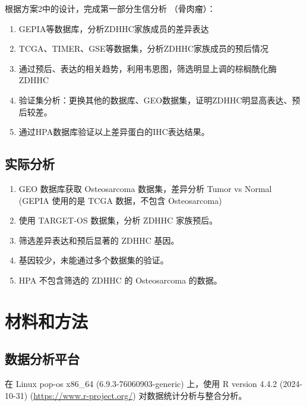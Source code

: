 \documentclass[
]{article}
\providecommand{\tightlist}{%
  \setlength{\itemsep}{0pt}\setlength{\parskip}{0pt}}
\begin{document}
根据方案2中的设计，完成第一部分生信分析 （骨肉瘤）：

\begin{enumerate}
\def\labelenumi{\arabic{enumi}.}
\tightlist
\item
  GEPIA等数据库，分析ZDHHC家族成员的差异表达
\item
  TCGA、TIMER、GSE等数据集，分析ZDHHC家族成员的预后情况
\item
  通过预后、表达的相关趋势，利用韦恩图，筛选明显上调的棕榈酰化酶ZDHHC
\item
  验证集分析：更换其他的数据库、GEO数据集，证明ZDHHC明显高表达、预后较差。
\item
  通过HPA数据库验证以上差异蛋白的IHC表达结果。
\end{enumerate}

\hypertarget{ux5b9eux9645ux5206ux6790}{%
\subsection{实际分析}\label{ux5b9eux9645ux5206ux6790}}

\begin{enumerate}
\def\labelenumi{\arabic{enumi}.}
\tightlist
\item
  GEO 数据库获取 Osteosarcoma 数据集，差异分析 Tumor vs Normal (GEPIA 使用的是 TCGA 数据，不包含 Osteosarcoma)
\item
  使用 TARGET-OS 数据集，分析 ZDHHC 家族预后。
\item
  筛选差异表达和预后显著的 ZDHHC 基因。
\item
  基因较少，未能通过多个数据集的验证。
\item
  HPA 不包含筛选的 ZDHHC 的 Osteosarcoma 的数据。
\end{enumerate}

\hypertarget{introduction}{%
\section{材料和方法}\label{introduction}}

\hypertarget{ux6570ux636eux5206ux6790ux5e73ux53f0}{%
\subsection{数据分析平台}\label{ux6570ux636eux5206ux6790ux5e73ux53f0}}

在 Linux pop-os x86\_64 (6.9.3-76060903-generic) 上，使用 R version 4.4.2 (2024-10-31) (\url{https://www.r-project.org/}) 对数据统计分析与整合分析。
\end{document}
